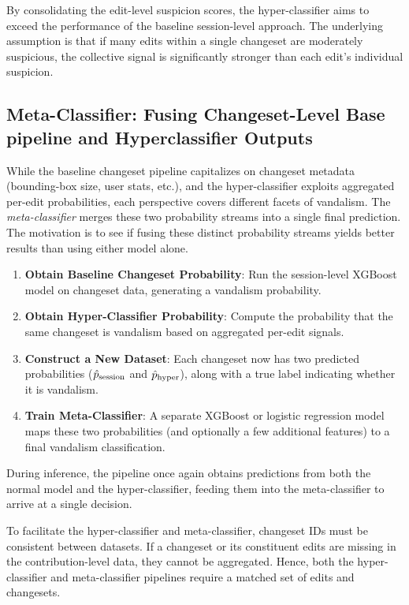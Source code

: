 \documentclass[
    13pt, %
    a4paper, %
    DIV14, %
    listof=totoc, %
    bibliography=totoc, %
    index=totoc, %
    headsepline
]{scrreprt}
\begin{document}
\noindent
By consolidating the edit-level suspicion scores, the hyper-classifier aims to exceed the performance of the baseline session-level approach. The underlying assumption is that if many edits within a single changeset are moderately suspicious, the collective signal is significantly stronger than each edit’s individual suspicion.

\subsection{Meta-Classifier: Fusing Changeset-Level Base pipeline and Hyperclassifier Outputs}
\label{subsec:meta_classifier}

While the baseline changeset pipeline capitalizes on changeset metadata (bounding-box size, user stats, etc.), and the hyper-classifier exploits aggregated per-edit probabilities, each perspective covers different facets of vandalism. The \emph{meta-classifier} merges these two probability streams into a single final prediction. The motivation is to see if fusing these distinct probability streams yields better results than using either model alone.

\begin{enumerate}
    \item \textbf{Obtain Baseline Changeset Probability}: Run the session-level XGBoost model on changeset data, generating a vandalism probability.
    \item \textbf{Obtain Hyper-Classifier Probability}: Compute the probability that the same changeset is vandalism based on aggregated per-edit signals.
    \item \textbf{Construct a New Dataset}: Each changeset now has two predicted probabilities (\(\hat{p}_{\textnormal{session}}\) and \(\hat{p}_{\textnormal{hyper}}\)), along with a true label indicating whether it is vandalism.
    \item \textbf{Train Meta-Classifier}: A separate XGBoost or logistic regression model maps these two probabilities (and optionally a few additional features) to a final vandalism classification.
\end{enumerate}

\noindent
During inference, the pipeline once again obtains predictions from both the normal model and the hyper-classifier, feeding them into the meta-classifier to arrive at a single decision.

To facilitate the hyper-classifier and meta-classifier, changeset IDs must be consistent between datasets. If a changeset or its constituent edits are missing in the contribution-level data, they cannot be aggregated. Hence, both the hyper-classifier and meta-classifier pipelines require a matched set of edits and changesets.
\end{document}
